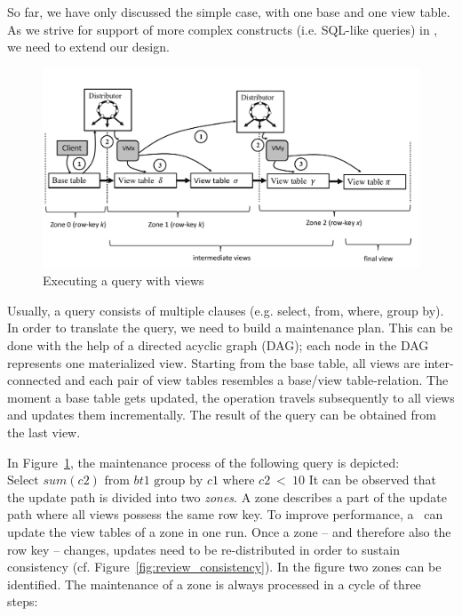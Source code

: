So far, we have only discussed the simple case, with one base and one view
table. As we strive for support of more complex constructs (i.e. SQL-like 
queries) in \VMS, we need to extend our design.

\begin{figure}
  \centering
    \includegraphics[width=\linewidth]{figures/Concept}
    \caption{Executing a query with views}
    \label{fig:view_concept}
    \vspace{-2mm}
\end{figure}

Usually, a query consists of multiple clauses (e.g. select, from, where, 
group by). In order to translate the query, we need to build a 
maintenance plan. This can be done with the help of a directed acyclic 
graph (DAG); each node in the DAG represents one materialized view. 
Starting from the base table, all views are inter-connected and each 
pair of view tables resembles a base/view table-relation. The moment a 
base table gets updated, the operation travels subsequently to all views 
and updates them incrementally. The result of the query can be obtained 
from the last view. 



In Figure~\ref{fig:view_concept}, the maintenance process of the 
following query is depicted: $\text{Select }sum(c2)\text{ from 
}bt1\text{ group by }c1\text{ where }c2\:<\:10$ It can be observed that 
the update path is divided into two \textit{zones}. A zone describes a 
part of the update path where all views possess the same row key. To improve
performance, a \VM\ can update the view tables of a zone in one run. 
Once a zone 
-- and therefore also the row key -- changes, updates need to be 
re-distributed in order to sustain consistency (cf. 
Figure~\ref{fig:review_consistency}). In the figure two zones can be 
identified. The maintenance of a zone is always processed in a cycle of 
three steps: 


